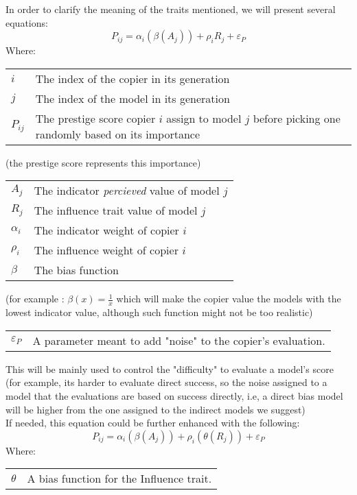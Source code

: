 \documentclass[11pt]{article}
\makeatletter
\newenvironment{conditions}
  {\par\vspace{\abovedisplayskip}\noindent\begin{tabular}{>{$}l<{$} @{${}={}$} l}}
  {\end{tabular}\par\vspace{\belowdisplayskip}}
\makeatother
\begin{document}
  In order to clarify the meaning of the traits mentioned, we will present several equations:
  \begin{equation}\label{prestige}
	P_{ij} = \alpha_{i}(\beta(A_{j})) + \rho_{i} R_{j} + \varepsilon_{P}
 \end{equation}
 Where:
  \begin{conditions}
  i & The index of the copier in its generation \\
  j & The index of the model in its generation \\
 P_{ij} & The prestige score copier $i$ assign to model $j$ before picking one randomly based on its importance \\
 \end{conditions}
  (the prestige score represents this importance) 
 \begin{conditions}
A_{j} & The indicator \textit{percieved} value of model $j$ \\
R_{j} & The influence trait value of model $j$ \\
\alpha_{i} & The indicator weight of copier $i$ \\
\rho_{i} & The influence weight of copier $i$ \\
  \beta & The bias function
  \end{conditions}
  (for example :  $\beta(x) = \frac{1}{x}$ which will make the copier value the models with the lowest indicator value, although such function might not be too realistic) 
  \begin{conditions}
 \varepsilon_{P} & A parameter meant to add "noise" to the copier's evaluation.
 \end{conditions}
  This will be mainly used to control the "difficulty" to evaluate a model's score (for example, its harder to evaluate direct success, so the noise assigned to a model that the evaluations are based on success directly, i.e, a direct bias model will be higher from the one assigned to the indirect models we suggest) \\
 
 If needed, this equation could be further enhanced with the following:
  \begin{equation}\label{influence preference}
	P_{ij} = \alpha_{i}(\beta(A_{j})) + \rho_{i} (\theta(R_{j})) + \varepsilon_{P}
 \end{equation}
 Where:
  \begin{conditions}
 \theta & A bias function for the Influence trait.
 \end{conditions}
\end{document}
